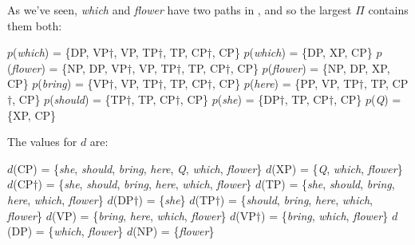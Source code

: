 \documentclass[output=paper]{langsci/langscibook}
\begin{document}
%

As we've seen, \emph{which} and \emph{flower} have two paths in , and so the largest $\Pi$ contains them both:
\begin{exe}
	\ex \label{ex:bigpimulti3}
	\begin{xlist}
		\ex $p$(\emph{which}) = \{DP, VP$\dag$, VP, TP$\dag$, TP, CP$\dag$, CP\}
		\ex $p$(\emph{which}) = \{DP, XP, CP\}
		\ex $p$(\emph{flower}) = \{NP, DP, VP$\dag$, VP, TP$\dag$, TP, CP$\dag$, CP\}
		\ex $p$(\emph{flower}) = \{NP, DP, XP, CP\}
		\ex $p$(\emph{bring}) = \{VP$\dag$, VP, TP$\dag$, TP, CP$\dag$, CP\}
		\ex $p$(\emph{here}) = \{PP, VP, TP$\dag$, TP, CP$\dag$, CP\}
		\ex $p$(\emph{should}) = \{TP$\dag$, TP, CP$\dag$, CP\}
		\ex $p$(\emph{she}) = \{DP$\dag$, TP, CP$\dag$, CP\}
		\ex $p$(\emph{Q}) = \{XP, CP\}
	\end{xlist}
\end{exe}

\newpage
The values for $d$ are:
\begin{exe}
	\ex \label{ex:bigdmulti3}
	\begin{xlist}
		\ex $d$(CP) = \{\emph{she}, \emph{should}, \emph{bring}, \emph{here}, \emph{Q}, \emph{which}, \emph{flower}\}
		\ex \label{ex:bdmulti3xp}$d$(XP) = \{\emph{Q}, \emph{which}, \emph{flower}\}
		\ex $d$(CP$\dag$) = \{\emph{she}, \emph{should}, \emph{bring}, \emph{here}, \emph{which}, \emph{flower}\}
		\ex $d$(TP) = \{\emph{she}, \emph{should}, \emph{bring}, \emph{here}, \emph{which}, \emph{flower}\}
		\ex $d$(DP$\dag$) = \{\emph{she}\}
		\ex $d$(TP$\dag$) = \{\emph{should}, \emph{bring}, \emph{here}, \emph{which}, \emph{flower}\}
		\ex \label{ex:vp} $d$(VP) = \{\emph{bring}, \emph{here}, \emph{which}, \emph{flower}\}
		\ex \label{ex:vpdag}$d$(VP$\dag$) = \{\emph{bring}, \emph{which}, \emph{flower}\}
		\ex $d$(DP) = \{\emph{which}, \emph{flower}\}
		\ex $d$(NP) = \{\emph{flower}\}
	\end{xlist}
\end{exe}
\end{document}
